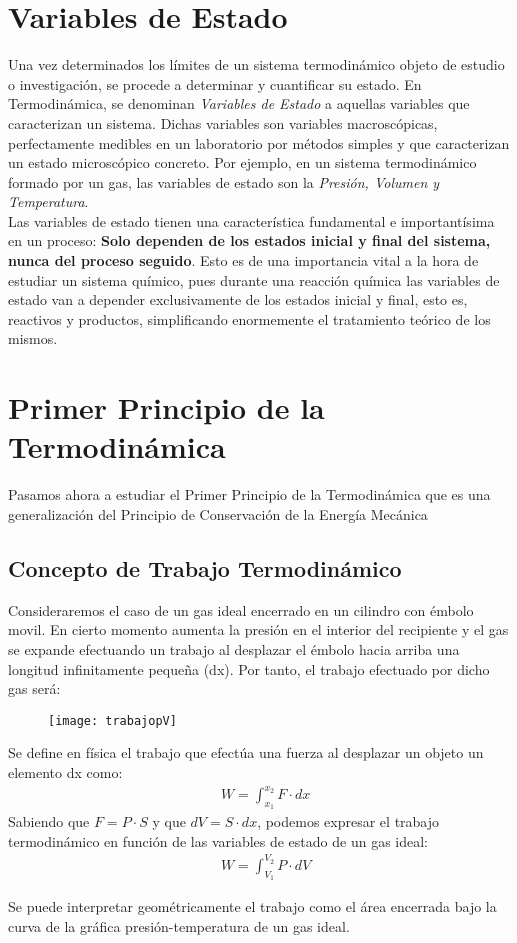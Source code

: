 \section{Variables de Estado}

Una vez determinados los límites de un sistema termodinámico objeto de estudio o investigación, se procede a determinar y cuantificar su estado. En Termodinámica, se denominan \emph{Variables de Estado} a aquellas variables que caracterizan un sistema. Dichas variables son variables macroscópicas, perfectamente medibles en un laboratorio por métodos simples y que caracterizan un estado microscópico concreto. Por ejemplo, en un sistema termodinámico formado por un gas, las variables de estado son la \emph{Presión, Volumen y Temperatura}.\\

Las variables de estado tienen una característica fundamental e importantísima en un proceso: \textbf{Solo dependen de los estados inicial y final del sistema, nunca del proceso seguido}. Esto es de una importancia vital a la hora de estudiar un sistema químico, pues durante una reacción química las variables de estado van a depender exclusivamente de los estados inicial y final, esto es, reactivos y productos, simplificando enormemente el tratamiento teórico de los mismos.

\section{Primer Principio de la Termodinámica}
Pasamos ahora a estudiar el Primer Principio de la Termodinámica que es una generalización del Principio de Conservación de la Energía Mecánica
\subsection{Concepto de Trabajo Termodinámico}

Consideraremos el caso de un gas ideal encerrado en un cilindro con émbolo movil. En cierto momento aumenta la presión en el interior del recipiente y el gas se expande efectuando un trabajo al desplazar el émbolo hacia arriba una longitud infinitamente pequeña (dx). Por tanto, el trabajo efectuado por dicho gas será:

\begin{figure}[h!]
	\centering
	\texttt{[image: trabajopV]}
\end{figure}

\begin{definition}
	Se define en física el trabajo que efectúa una fuerza al desplazar un objeto un elemento dx como:
	\begin{align}
		& W=\int_{x_1}^{x_2}F \cdot dx
	\end{align}
	Sabiendo que $F = P \cdot S$ y que $dV = S \cdot dx$, podemos expresar el trabajo termodinámico en función de las variables de estado de un gas ideal:
	\begin{align}
		& W=\int_{V_1}^{V_2}P \cdot dV
	\end{align}
\end{definition}

Se puede interpretar geométricamente el trabajo como el área encerrada bajo la curva de la gráfica presión-temperatura de un gas ideal.\\


